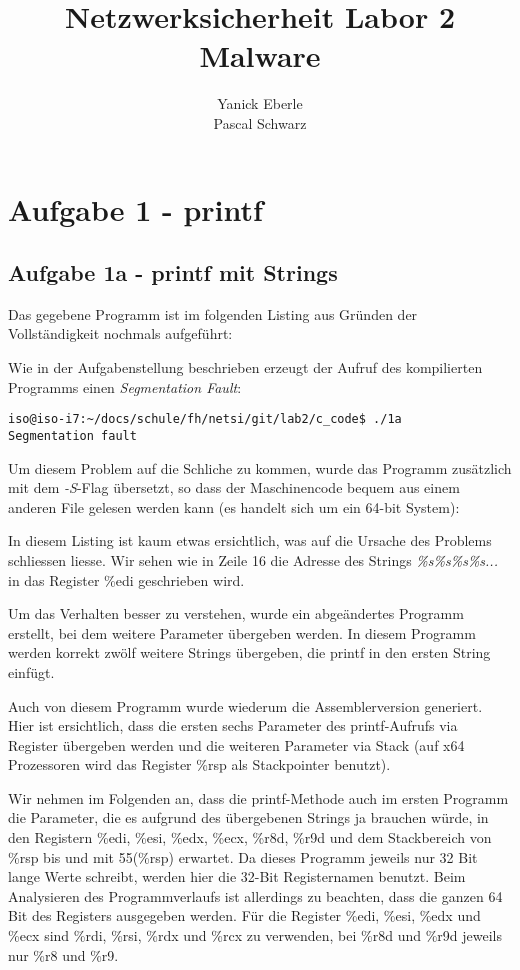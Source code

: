 \documentclass[a4paper,11pt,parskip=half]{scrartcl}
\title{Netzwerksicherheit Labor 2\\
	Malware}
\author{Yanick Eberle\\
		Pascal Schwarz}
\begin{document}
\maketitle
\date{}
\vfill
\tableofcontents
\newpage
\section{Aufgabe 1 - printf}
\subsection{Aufgabe 1a - printf mit Strings}
Das gegebene Programm ist im folgenden Listing aus Gründen der Vollständigkeit nochmals aufgeführt:

Wie in der Aufgabenstellung beschrieben erzeugt der Aufruf des kompilierten Programms einen \emph{Segmentation Fault}:
\begin{lstlisting}
iso@iso-i7:~/docs/schule/fh/netsi/git/lab2/c_code$ ./1a
Segmentation fault
\end{lstlisting}

Um diesem Problem auf die Schliche zu kommen, wurde das Programm zusätzlich mit dem \emph{-S}-Flag übersetzt, so dass der Maschinencode bequem aus einem anderen File gelesen werden kann (es handelt sich um ein 64-bit System):


In diesem Listing ist kaum etwas ersichtlich, was auf die Ursache des Problems schliessen liesse. Wir sehen wie in Zeile 16 die Adresse des Strings \emph{\%s\%s\%s\%s...} in das Register \%edi geschrieben wird.

Um das Verhalten besser zu verstehen, wurde ein abgeändertes Programm erstellt, bei dem weitere Parameter übergeben werden. In diesem Programm werden korrekt zwölf weitere Strings übergeben, die printf in den ersten String einfügt.


Auch von diesem Programm wurde wiederum die Assemblerversion generiert. Hier ist ersichtlich, dass die ersten sechs Parameter des printf-Aufrufs via Register übergeben werden und die weiteren Parameter via Stack (auf x64 Prozessoren wird das Register \%rsp als Stackpointer benutzt).


Wir nehmen im Folgenden an, dass die printf-Methode auch im ersten Programm die Parameter, die es aufgrund des übergebenen Strings ja brauchen würde, in den Registern \%edi, \%esi, \%edx, \%ecx, \%r8d, \%r9d und dem Stackbereich von \%rsp bis und mit 55(\%rsp) erwartet. Da dieses Programm jeweils nur 32 Bit lange Werte schreibt, werden hier die 32-Bit Registernamen benutzt. Beim Analysieren des Programmverlaufs ist allerdings zu beachten, dass die ganzen 64 Bit des Registers ausgegeben werden. Für die Register \%edi, \%esi, \%edx und \%ecx sind \%rdi, \%rsi, \%rdx und \%rcx zu verwenden, bei \%r8d und \%r9d jeweils nur \%r8 und \%r9.
\end{document}
